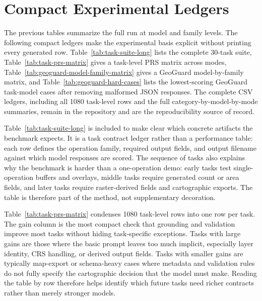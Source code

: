\documentclass[]{interact}
\begin{document}
\clearpage
\section{Compact Experimental Ledgers}

The previous tables summarize the full run at model and family levels. The following compact ledgers make the experimental basis explicit without printing every generated row. Table~\ref{tab:task-suite-long} lists the complete 30-task suite, Table~\ref{tab:task-prs-matrix} gives a task-level PRS matrix across modes, Table~\ref{tab:geoguard-model-family-matrix} gives a GeoGuard model-by-family matrix, and Table~\ref{tab:geoguard-hard-cases} lists the lowest-scoring GeoGuard task-model cases after removing malformed JSON responses. The complete CSV ledgers, including all 1080 task-level rows and the full category-by-model-by-mode summaries, remain in the repository and are the reproducibility source of record.



Table~\ref{tab:task-suite-long} is included to make clear which concrete artifacts the benchmark expects. It is a task contract ledger rather than a performance table: each row defines the operation family, required output fields, and output filename against which model responses are scored. The sequence of tasks also explains why the benchmark is harder than a one-operation demo: early tasks test single-operation buffers and overlays, middle tasks require generated count or area fields, and later tasks require raster-derived fields and cartographic exports. The table is therefore part of the method, not supplementary decoration.



Table~\ref{tab:task-prs-matrix} condenses 1080 task-level rows into one row per task. The gain column is the most compact check that grounding and validation improve most tasks without hiding task-specific exceptions. Tasks with large gains are those where the basic prompt leaves too much implicit, especially layer identity, CRS handling, or derived output fields. Tasks with smaller gains are typically map-export or schema-heavy cases where metadata and validation rules do not fully specify the cartographic decision that the model must make. Reading the table by row therefore helps identify which future tasks need richer contracts rather than merely stronger models.

\clearpage

\end{document}
